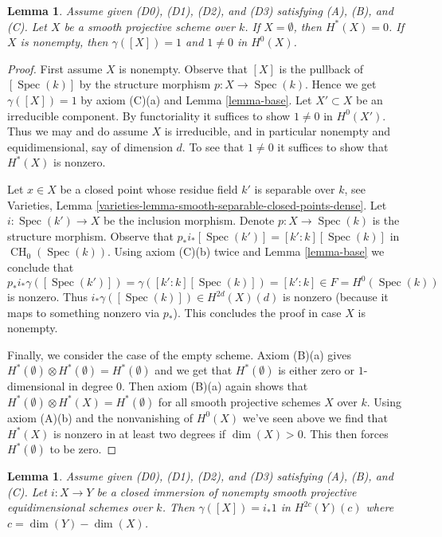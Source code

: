 \documentclass{stacks-project}
\theoremstyle{plain}
\newtheorem{lemma}[subsection]{Lemma}
\theoremstyle{definition}
\theoremstyle{remark}
\numberwithin{equation}{subsection}
\def\Spec{\mathop{\mathrm{Spec}}}
\def\CH{\mathop{\mathrm{CH}}\nolimits}
\begin{document}
\begin{lemma}
\label{lemma-unit}
Assume given (D0), (D1), (D2), and (D3) satisfying (A), (B), and (C).
Let $X$ be a smooth projective scheme over $k$.
If $X = \emptyset$, then $H^*(X) = 0$.
If $X$ is nonempty, then $\gamma([X]) = 1$ and $1 \not = 0$ in $H^0(X)$.
\end{lemma}

\begin{proof}
First assume $X$ is nonempty.
Observe that $[X]$ is the pullback of $[\Spec(k)]$ by the structure morphism
$p : X \to \Spec(k)$. Hence we get $\gamma([X]) = 1$ by axiom (C)(a)
and Lemma \ref{lemma-base}. Let $X' \subset X$ be an irreducible component.
By functoriality it suffices to show $1 \not = 0$ in $H^0(X')$.
Thus we may and do assume $X$ is irreducible, and in particular
nonempty and equidimensional, say of dimension $d$.
To see that $1 \not = 0$ it suffices to show that $H^*(X)$ is nonzero.

\medskip\noindent
Let $x \in X$ be a closed point whose residue field $k'$
is separable over $k$, see
Varieties, Lemma \ref{varieties-lemma-smooth-separable-closed-points-dense}.
Let $i : \Spec(k') \to X$ be the inclusion morphism.
Denote  $p : X \to \Spec(k)$ is the structure morphism.
Observe that
$p_*i_*[\Spec(k')] = [k' : k][\Spec(k)]$ in $\CH_0(\Spec(k))$.
Using axiom (C)(b) twice and Lemma \ref{lemma-base}
we conclude that
$$
p_*i_*\gamma([\Spec(k')]) = \gamma([k' : k][\Spec(k)]) = [k' : k]
\in F = H^0(\Spec(k))
$$
is nonzero. Thus $i_*\gamma([\Spec(k)]) \in H^{2d}(X)(d)$ is nonzero
(because it maps to something nonzero via $p_*$). This concludes the proof
in case $X$ is nonempty.

\medskip\noindent
Finally, we consider the case of the empty scheme. Axiom (B)(a) gives
$H^*(\emptyset) \otimes H^*(\emptyset) = H^*(\emptyset)$ and
we get that $H^*(\emptyset)$ is either zero or $1$-dimensional
in degree $0$. Then axiom (B)(a) again shows that
$H^*(\emptyset) \otimes H^*(X) = H^*(\emptyset)$ for
all smooth projective schemes $X$ over $k$. Using axiom (A)(b)
and the nonvanishing of $H^0(X)$ we've seen above
we find that $H^*(X)$ is nonzero in at least two degrees
if $\dim(X) > 0$. This then forces $H^*(\emptyset)$ to be zero.
\end{proof}

\begin{lemma}
\label{lemma-push-unit}
Assume given (D0), (D1), (D2), and (D3) satisfying (A), (B), and (C).
Let $i : X \to Y$ be a closed immersion of nonempty smooth projective
equidimensional schemes over $k$. Then
$\gamma([X]) = i_*1$ in $H^{2c}(Y)(c)$ where $c = \dim(Y) - \dim(X)$.
\end{lemma}
\end{document}
